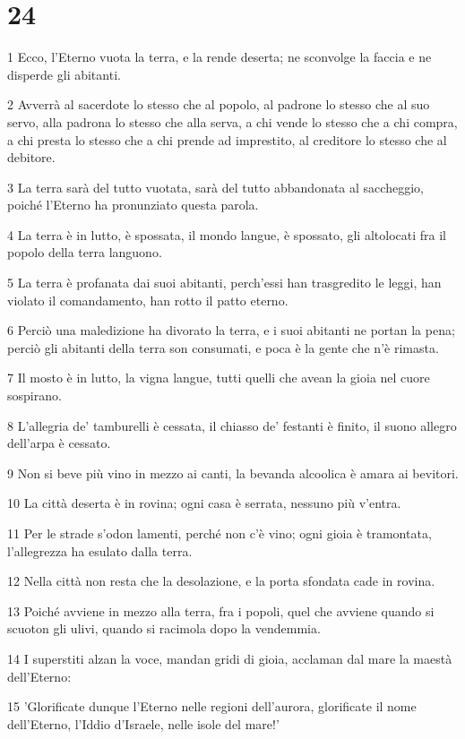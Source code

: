 \chapter{24}

\par 1 Ecco, l'Eterno vuota la terra, e la rende deserta; ne sconvolge la faccia e ne disperde gli abitanti.
\par 2 Avverrà al sacerdote lo stesso che al popolo, al padrone lo stesso che al suo servo, alla padrona lo stesso che alla serva, a chi vende lo stesso che a chi compra, a chi presta lo stesso che a chi prende ad imprestito, al creditore lo stesso che al debitore.
\par 3 La terra sarà del tutto vuotata, sarà del tutto abbandonata al saccheggio, poiché l'Eterno ha pronunziato questa parola.
\par 4 La terra è in lutto, è spossata, il mondo langue, è spossato, gli altolocati fra il popolo della terra languono.
\par 5 La terra è profanata dai suoi abitanti, perch'essi han trasgredito le leggi, han violato il comandamento, han rotto il patto eterno.
\par 6 Perciò una maledizione ha divorato la terra, e i suoi abitanti ne portan la pena; perciò gli abitanti della terra son consumati, e poca è la gente che n'è rimasta.
\par 7 Il mosto è in lutto, la vigna langue, tutti quelli che avean la gioia nel cuore sospirano.
\par 8 L'allegria de' tamburelli è cessata, il chiasso de' festanti è finito, il suono allegro dell'arpa è cessato.
\par 9 Non si beve più vino in mezzo ai canti, la bevanda alcoolica è amara ai bevitori.
\par 10 La città deserta è in rovina; ogni casa è serrata, nessuno più v'entra.
\par 11 Per le strade s'odon lamenti, perché non c'è vino; ogni gioia è tramontata, l'allegrezza ha esulato dalla terra.
\par 12 Nella città non resta che la desolazione, e la porta sfondata cade in rovina.
\par 13 Poiché avviene in mezzo alla terra, fra i popoli, quel che avviene quando si scuoton gli ulivi, quando si racimola dopo la vendemmia.
\par 14 I superstiti alzan la voce, mandan gridi di gioia, acclaman dal mare la maestà dell'Eterno:
\par 15 'Glorificate dunque l'Eterno nelle regioni dell'aurora, glorificate il nome dell'Eterno, l'Iddio d'Israele, nelle isole del mare!'
